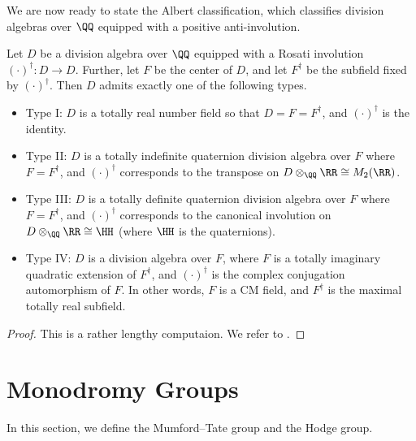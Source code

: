 \documentclass[../thesis.tex]{subfiles}
\begin{document}
We are now ready to state the Albert classification, which classifies division algebras over $\QQ$ equipped with a positive anti-involution.
\begin{theorem} \label{thm:albert-classification}
	Let $D$ be a division algebra over $\QQ$ equipped with a Rosati involution $(\cdot)^\dagger\colon D\to D$. Further, let $F$ be the center of $D$, and let $F^\dagger$ be the subfield fixed by $(\cdot)^\dagger$. Then $D$ admits exactly one of the following types.
	\begin{itemize}
		\item Type I: $D$ is a totally real number field so that $D=F=F^\dagger$, and $(\cdot)^\dagger$ is the identity.
		\item Type II: $D$ is a totally indefinite quaternion division algebra over $F$ where $F=F^\dagger$, and $(\cdot)^\dagger$ corresponds to the transpose on $D\otimes_\QQ\RR\cong M_2(\RR)$.
		\item Type III: $D$ is a totally definite quaternion division algebra over $F$ where $F=F^\dagger$, and $(\cdot)^\dagger$ corresponds to the canonical involution on $D\otimes_\QQ\RR\cong\HH$ (where $\HH$ is the quaternions).
		\item Type IV: $D$ is a division algebra over $F$, where $F$ is a totally imaginary quadratic extension of $F^\dagger$, and $(\cdot)^\dagger$ is the complex conjugation automorphism of $F$. In other words, $F$ is a CM field, and $F^\dagger$ is the maximal totally real subfield.
	\end{itemize}
\end{theorem}
\begin{proof}
	This is a rather lengthy computaion. We refer to \cite[Section~21, Application I]{mumford-abelian-varieties}.
\end{proof}

\section{Monodromy Groups}
In this section, we define the Mumford--Tate group and the Hodge group.
\end{document}
